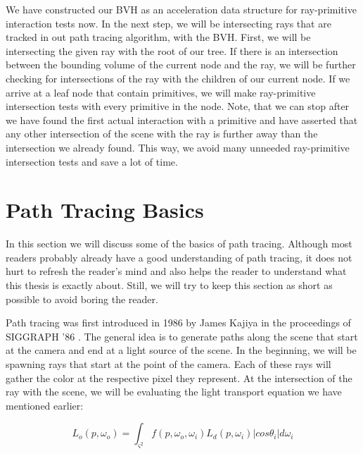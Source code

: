 We have constructed our BVH as an acceleration data structure for ray-primitive interaction tests now. In the next step, we will be intersecting rays that are tracked in out path tracing algorithm, with the BVH. First, we will be intersecting the given ray with the root of our tree. If there is an intersection between the bounding volume of the current node and the ray, we will be further checking for intersections of the ray with the children of our current node. If we arrive at a leaf node that contain primitives, we will make ray-primitive intersection tests with every primitive in the node. Note, that we can stop after we have found the first actual interaction with a primitive and have asserted that any other intersection of the scene with the ray is further away than the intersection we already found.  This way, we avoid many unneeded ray-primitive intersection tests 
and save a lot of time.

\section{Path Tracing Basics}
\label{sec:preliminaries:pat}

In this section we will discuss some of the basics of path tracing. Although most readers probably already have a good understanding of path tracing, it does not hurt to refresh the reader's mind and also helps the reader to understand what this thesis is exactly about. Still, we will try to keep this section as short as possible to avoid boring the reader.

Path tracing was first introduced in 1986 by James Kajiya in the proceedings of SIGGRAPH '86 \cite{JTK}. The general idea is to generate paths along the scene that start at the camera and end at a light source of the scene. In the beginning, we will be spawning rays that start at the point of the camera. Each of these rays will gather the color at the respective pixel they represent. At the intersection of the ray with the scene, we will be evaluating the light transport equation we have mentioned earlier:

\begin{equation}
L_o(p, \omega_o) = \int_{\varsigma^2}f(p, \omega_o, \omega_i)L_d(p, \omega_i)|cos\theta_i|d\omega_i
\end{equation}

